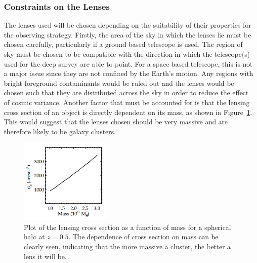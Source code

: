 	\subsubsection{Constraints on the Lenses} %
	\label{sub:constraints_on_the_lenses}
		The lenses used will be chosen depending on the suitability of their properties for the observing strategy. Firstly, the area of the sky in which the lenses lie must be chosen carefully, particularly if a ground based telescope is used. The region of sky must be chosen to be compatible with the direction in which the telescope(s) used for the deep survey are able to point. For a space based telescope, this is not a major issue since they are not confined by the Earth's motion. Any regions with bright foreground contaminants would be ruled out and the lenses would be chosen such that they are distributed across the sky in order to reduce the effect of cosmic variance. Another factor that must be accounted for is that the lensing cross section of an object is directly dependent on its mass, as shown in Figure~\ref{fig:Lensing_cross_section_as_a_function_of_mass}\cite{Optimal_mass_configurations}. This would suggest that the lenses chosen should be very massive and are therefore likely to be galaxy clusters.
		\begin{figure}[htbp]
			\centering
				\includegraphics[width=0.4\textwidth]{../Images/Lensing_cross_section_as_a_function_of_mass.png}
			\caption[Lensing cross section as a function of mass]{\cite{Optimal_mass_configurations}Plot of the lensing cross section as a function of mass for a spherical halo at $z=0.5$. The dependence of cross section on mass can be clearly seen, indicating that the more massive a cluster, the better a lens it will be.\label{fig:Lensing_cross_section_as_a_function_of_mass}}
		\end{figure}

